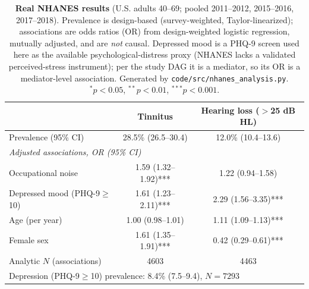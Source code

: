 \begin{table}[htbp]
\centering
\caption{\textbf{Real NHANES results} (U.S. adults 40--69; pooled 2011--2012, 2015--2016, 2017--2018). Prevalence is design-based (survey-weighted, Taylor-linearized); associations are odds ratios (OR) from design-weighted logistic regression, mutually adjusted, and are \emph{not} causal. Depressed mood is a PHQ-9 screen used here as the available psychological-distress proxy (NHANES lacks a validated perceived-stress instrument); per the study DAG it is a mediator, so its OR is a mediator-level association. Generated by \texttt{code/src/nhanes\_analysis.py}. $^{*}p<0.05$, $^{**}p<0.01$, $^{***}p<0.001$.}
\label{tab:results}
\small
\begin{tabular}{lcc}
\toprule
 & Tinnitus & Hearing loss ($>$25 dB HL) \\
\midrule
Prevalence (95\% CI) & 28.5\% (26.5--30.4) & 12.0\% (10.4--13.6) \\
\midrule
\multicolumn{3}{l}{\emph{Adjusted associations, OR (95\% CI)}} \\
\quad Occupational noise & 1.59 (1.32--1.92)*** & 1.22 (0.94--1.58) \\
\quad Depressed mood (PHQ-9$\geq$10) & 1.61 (1.23--2.11)*** & 2.29 (1.56--3.35)*** \\
\quad Age (per year) & 1.00 (0.98--1.01) & 1.11 (1.09--1.13)*** \\
\quad Female sex & 1.61 (1.35--1.91)*** & 0.42 (0.29--0.61)*** \\
\midrule
Analytic $N$ (associations) & 4603 & 4463 \\
\midrule
\multicolumn{3}{l}{Depression (PHQ-9$\geq$10) prevalence: 8.4\% (7.5--9.4), $N=7293$} \\
\bottomrule
\end{tabular}
\end{table}
